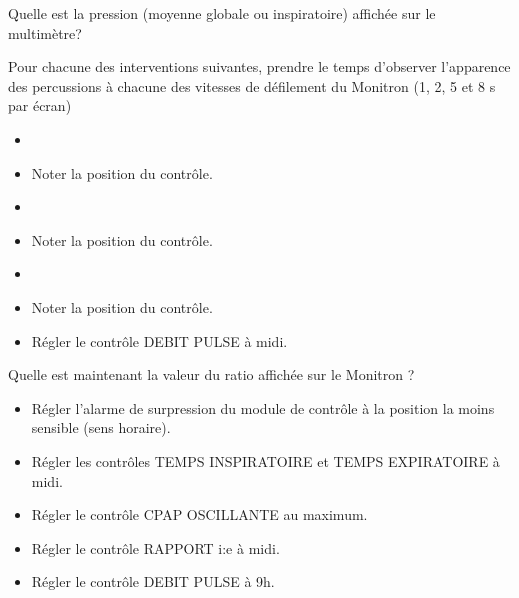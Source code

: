 \begin{exercice}
	Quelle est la pression (moyenne globale ou inspiratoire) affichée sur le multimètre?
	\shortanswer[\cmh]

	Pour chacune des interventions suivantes, prendre le temps d'observer l'apparence des percussions à chacune des vitesses de défilement du Monitron (1, 2, 5 et 8 s par écran)

	\begin{itemize}
		\item {}
		\item Noter la position du contrôle. 
	\end{itemize}
	\qpmoy

	\begin{itemize}
		\item {}
		\item Noter la position du contrôle. 
	\end{itemize}
	\qpmoy

	\begin{itemize}
		\item {}
		\item Noter la position du contrôle. 
	\end{itemize}
	\qpmoy

	\exsubsection{}


	\begin{itemize}
		\item Régler le contrôle DEBIT PULSE à midi.
	\end{itemize}

	Quelle est maintenant la valeur du ratio \ie  affichée sur le Monitron ?
	\shortanswer

	\exsubsection{}

	\begin{itemize}
		\item Régler l'alarme de surpression du module de contrôle à la position la moins sensible (sens horaire).
		\item Régler les contrôles TEMPS INSPIRATOIRE et TEMPS EXPIRATOIRE à midi.
		\item Régler le contrôle CPAP OSCILLANTE au maximum.
		\item Régler le contrôle RAPPORT i:e à midi.
		\item Régler le contrôle DEBIT PULSE à 9h.
	\end{itemize}


\end{exercice}
